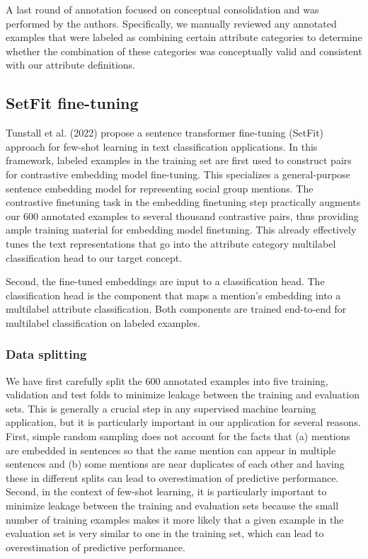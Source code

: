 \documentclass[12pt]{article}
\begin{document}
A last round of annotation focused on conceptual consolidation and was performed by the authors.
Specifically, we manually reviewed any annotated examples that were labeled as combining certain attribute categories to determine whether the combination of these categories was conceptually valid and consistent with our attribute definitions.

\subsection{SetFit fine-tuning}\label{sec-apx_setfit}

Tunstall et al. (2022) propose a sentence transformer fine-tuning (SetFit) approach for few-shot learning in text classification applications.
In this framework, labeled examples in the training set are first used to construct pairs for contrastive embedding model fine-tuning.
This specializes a general-purpose sentence embedding model for representing social group mentions.
The contrastive finetuning task in the embedding finetuning step practically augments our 600 annotated examples to several thousand contrastive pairs, thus providing ample training material for embedding model finetuning.
This already effectively tunes the text representations that go into the attribute category multilabel classification head to our target concept.

Second, the fine-tuned embeddings are input to a classification head.
The classification head is the component that maps a mention's embedding into a multilabel attribute classification.
Both components are trained end-to-end for multilabel classification on labeled examples.

\subsubsection{Data splitting}\label{data-splitting}

We have first carefully split the 600 annotated examples into five training, validation and test folds to minimize leakage between the training and evaluation sets.
This is generally a crucial step in any supervised machine learning application, but it is particularly important in our application for several reasons.
First, simple random sampling does not account for the facts that
(a) mentions are embedded in sentences so that the same mention can appear in multiple sentences and
(b) some mentions are near duplicates of each other and having these in different splits can lead to overestimation of predictive performance.
Second, in the context of few-shot learning, it is particularly important to minimize leakage between the training and evaluation sets because the small number of training examples makes it more likely that a given example in the evaluation set is very similar to one in the training set, which can lead to overestimation of predictive performance.
\end{document}

